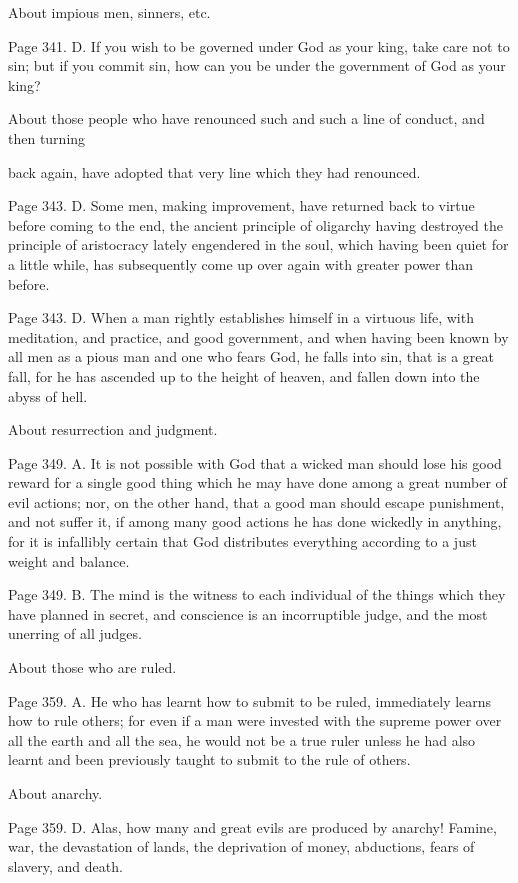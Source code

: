 About impious men, sinners, etc.

Page 341. D. If you wish to be governed under God as your king, take care not to sin; but if you
commit sin, how can you be under the government of God as your king?

About those people who have renounced such and such a line of conduct, and then turning

back again, have adopted that very line which they had renounced.

Page 343. D. Some men, making improvement, have returned back to virtue before coming to the
end, the ancient principle of oligarchy having destroyed the principle of aristocracy lately
engendered in the soul, which having been quiet for a little while, has subsequently come up over
again with greater power than before.

Page 343. D. When a man rightly establishes himself in a virtuous life, with meditation, and
practice, and good government, and when having been known by all men as a pious man and one
who fears God, he falls into sin, that is a great fall, for he has ascended up to the height of heaven,
and fallen down into the abyss of hell.

About resurrection and judgment.

Page 349. A. It is not possible with God that a wicked man should lose his good reward for a single
good thing which he may have done among a great number of evil actions; nor, on the other hand,
that a good man should escape punishment, and not suffer it, if among many good actions he has
done wickedly in anything, for it is infallibly certain that God distributes everything according to a
just weight and balance.

Page 349. B. The mind is the witness to each individual of the things which they have planned in
secret, and conscience is an incorruptible judge, and the most unerring of all judges.

About those who are ruled.

Page 359. A. He who has learnt how to submit to be ruled, immediately learns how to rule others;
for even if a man were invested with the supreme power over all the earth and all the sea, he would
not be a true ruler unless he had also learnt and been previously taught to submit to the rule of
others.

About anarchy.

Page 359. D. Alas, how many and great evils are produced by anarchy! Famine, war, the
devastation of lands, the deprivation of money, abductions, fears of slavery, and death.

